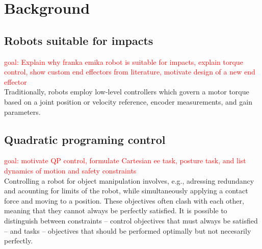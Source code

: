 \documentclass[a4paper, 10pt, conference]{ieeeconf}
\begin{document}
    \section{Background}
    \subsection{Robots suitable for impacts}
    \textcolor{red}{goal: Explain why franka emika robot is suitable for impacts, explain torque control, show custom end effectors from literature, motivate design of a new end effector}\\
    Traditionally, robots employ low-level controllers which govern a motor torque based on a joint position or velocity reference, encoder measurements, and gain parameters. 






    
    \subsection{Quadratic programing control} \label{sec:QP}
     \textcolor{red}{goal: motivate QP control, formulate Cartesian ee task, posture task, and list dynamics of motion and safety constraints }\\
     Controlling a robot for object manipulation involves, e.g., adressing redundancy and acounting for limits of the robot, while simultaneously applying a contact force and moving to a position. These objectives often clash with each other, meaning that they cannot always be perfectly satisfied. It is possible to distinguish between constraints -- control objectives that must always be satisfied -- and tasks -- objectives that should be performed optimally but not necesarily perfectly.
\end{document}
